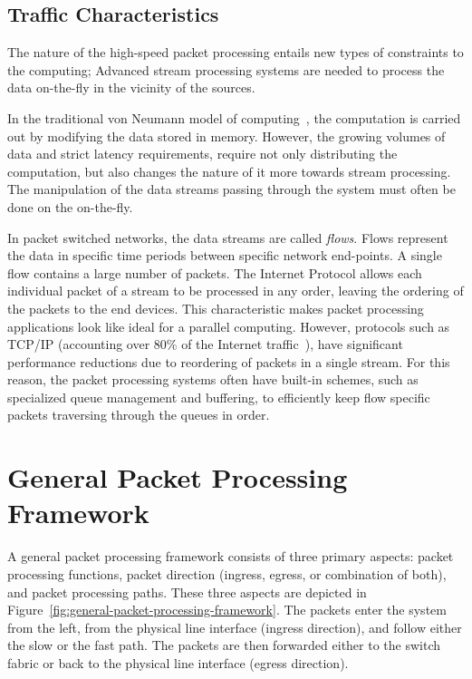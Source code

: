 \subsection{Traffic Characteristics}
The nature of the high-speed packet processing entails new types of constraints to the computing; Advanced stream processing systems are needed to process the data on-the-fly in the vicinity of the sources.~\cite{Bonomi:2012:Fog}

In the traditional von Neumann model of computing~\cite{Neumann:1993:EDVAC}, the computation is carried out by modifying the data stored in memory. However, the growing volumes of data and strict latency requirements, require not only distributing the computation, but also changes the nature of it more towards stream processing. The manipulation of the data streams passing through the system must often be done on the on-the-fly.~\cite{Bonomi:2012:Fog, Thies:2002:StreamIt}

In packet switched networks, the data streams are called \emph{flows}. Flows represent the data in specific time periods between specific network end-points. A single flow contains a large number of packets. The Internet Protocol allows each individual packet of a stream to be processed in any order, leaving the ordering of the packets to the end devices. This characteristic makes packet processing applications look like ideal for a parallel computing. However, protocols such as TCP/IP (accounting over 80\% of the Internet traffic~\cite{Fraleigh:2001:Packet}), have significant performance reductions due to reordering of packets in a single stream. For this reason, the packet processing systems often have built-in schemes, such as specialized queue management and buffering, to efficiently keep flow specific packets traversing through the queues in order.~\cite{Govind:2008:PacketReorder, Kumar:1998:RouterArchitecture}

\section{General Packet Processing Framework}

A general packet processing framework consists of three primary aspects: packet processing functions, packet direction (ingress, egress, or combination of both), and packet processing paths. These three aspects are depicted in Figure~\ref{fig:general-packet-processing-framework}. The packets enter the system from the left, from the physical line interface (ingress direction), and follow either the slow or the fast path. The packets are then forwarded either to the switch fabric or back to the physical line interface (egress direction).~\cite{Giladi:2008:Network}

